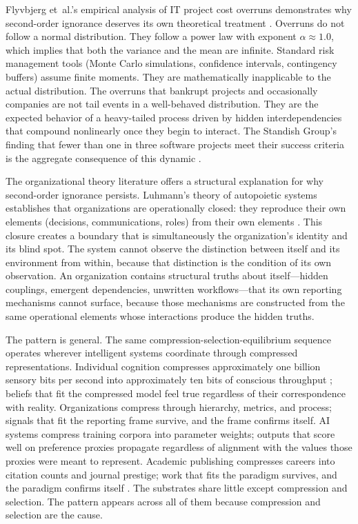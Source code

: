 \documentclass[11pt,a4paper]{article}
\begin{document}
Flyvbjerg et~al.'s empirical analysis of IT project cost overruns demonstrates why second-order ignorance deserves its own theoretical treatment \citep{flyvbjerg2022}. Overruns do not follow a normal distribution. They follow a power law with exponent $\alpha \approx 1.0$, which implies that both the variance and the mean are infinite. Standard risk management tools (Monte Carlo simulations, confidence intervals, contingency buffers) assume finite moments. They are mathematically inapplicable to the actual distribution. The overruns that bankrupt projects and occasionally companies are not tail events in a well-behaved distribution. They are the expected behavior of a heavy-tailed process driven by hidden interdependencies that compound nonlinearly once they begin to interact. The Standish Group's finding that fewer than one in three software projects meet their success criteria is the aggregate consequence of this dynamic \citep{standish2015}.

The organizational theory literature offers a structural explanation for why second-order ignorance persists. Luhmann's theory of autopoietic systems establishes that organizations are operationally closed: they reproduce their own elements (decisions, communications, roles) from their own elements \citep{luhmann1995}. This closure creates a boundary that is simultaneously the organization's identity and its blind spot. The system cannot observe the distinction between itself and its environment from within, because that distinction is the condition of its own observation. An organization contains structural truths about itself---hidden couplings, emergent dependencies, unwritten workflows---that its own reporting mechanisms cannot surface, because those mechanisms are constructed from the same operational elements whose interactions produce the hidden truths.

The pattern is general. The same compression-selection-equilibrium sequence operates wherever intelligent systems coordinate through compressed representations. Individual cognition compresses approximately one billion sensory bits per second into approximately ten bits of conscious throughput \citep{zheng2025}; beliefs that fit the compressed model feel true regardless of their correspondence with reality. Organizations compress through hierarchy, metrics, and process; signals that fit the reporting frame survive, and the frame confirms itself. AI systems compress training corpora into parameter weights; outputs that score well on preference proxies propagate regardless of alignment with the values those proxies were meant to represent. Academic publishing compresses careers into citation counts and journal prestige; work that fits the paradigm survives, and the paradigm confirms itself \citep{smaldino2016}. The substrates share little except compression and selection. The pattern appears across all of them because compression and selection are the cause.
\end{document}
